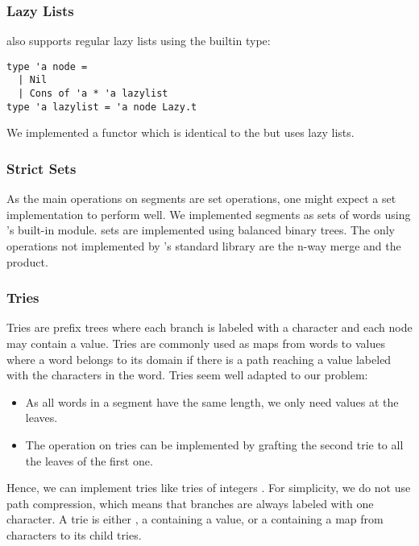 \subsubsection{Lazy Lists}

\ocaml also supports regular lazy lists using the builtin  type:

\begin{lstlisting}
type 'a node =
  | Nil
  | Cons of 'a * 'a lazylist
type 'a lazylist = 'a node Lazy.t
\end{lstlisting}

We implemented a  functor which is identical to the
 but uses lazy lists.

\subsubsection{Strict Sets}

As the main operations on segments are set operations, one might 
expect a set implementation to perform well. We implemented segments as sets
of words using \ocaml's built-in  module. \ocaml sets are implemented
using balanced binary trees.
The only operations not implemented by \ocaml's standard library are
the n-way merge and the product.

\subsubsection{Tries}

Tries \cite{Fredkin1960} are prefix trees where each branch is labeled
with a character and each node may contain a value. Tries are commonly used
as maps from words to values where a word belongs to its domain if there is a
path reaching a value labeled with the characters in the word.
Tries seem well adapted to our problem:
\begin{itemize}[leftmargin=*]
\item As all words in a segment have the same length, we only need values at the leaves.
\item The  operation on tries can be implemented by
  grafting the second trie to all the leaves of the first one.
\end{itemize}

Hence, we can implement tries like tries of integers \cite{Okasaki98fastmergeable}.
For simplicity, we do not use path compression, which means
that branches are always labeled with one character.
A trie is either , a  containing a value, or a  containing a map from characters
to its child tries.

